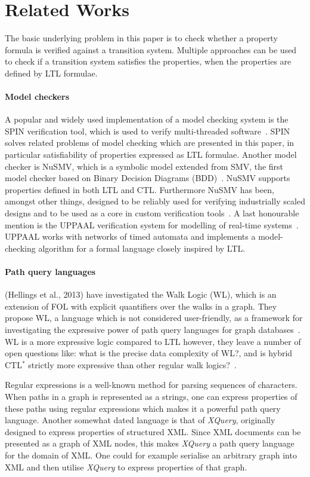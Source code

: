 \section{Related Works}\label{sec:related-works}
The basic underlying problem in this paper is to check whether a property formula is verified against a transition system. Multiple approaches can be used to check if a transition system satisfies the properties, when the properties are defined by LTL formulae.

\paragraph{Model checkers}
A popular and widely used implementation of a model checking system is the SPIN verification tool, which is used to verify multi-threaded software~\cite{spin}. SPIN solves related problems of model checking which are presented in this paper, in particular satisfiability of properties expressed as LTL formulae.
Another model checker is NuSMV, which is a symbolic model extended from SMV, the first model checker based on Binary Decision Diagrams (BDD)~\cite{nusmv}. NuSMV supports properties defined in both LTL and CTL. Furthermore NuSMV has been, amongst other things, designed to be reliably used for verifying industrially scaled designs and to be used as a core in custom verification tools~\cite{nusmv}.
A last honourable mention is the UPPAAL verification system for modelling of real-time systems~\cite{uppaal}. UPPAAL works with networks of timed automata and implements a model-checking algorithm for a formal language closely inspired by LTL.

\paragraph{Path query languages}
(Hellings et al., 2013)\cite{hellings2013walk} have investigated the Walk Logic (WL), which is an extension of FOL with explicit quantifiers over the walks in a graph. They propose WL, a language which is not considered user-friendly, as a framework for investigating the expressive power of path query languages for graph databases~\cite{hellings2013walk}. WL is a more expressive logic compared to LTL however, they leave a number of open questions like: what is the precise data complexity of WL?, and is hybrid CTL$^\ast$ strictly more expressive than other regular walk logics?~\cite{hellings2013walk}.

Regular expressions is a well-known method for parsing sequences of characters. When paths in a graph is represented as a strings, one can express properties of these paths using regular expressions which makes it a powerful path query language. Another somewhat dated language is that of \emph{XQuery}, originally designed to express properties of structured XML. Since XML documents can be presented as a graph of XML nodes, this makes \emph{XQuery} a path query language for the domain of XML. One could for example serialise an arbitrary graph into XML and then utilise \emph{XQuery} to express properties of that graph.

